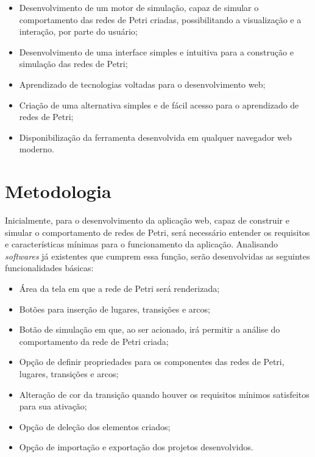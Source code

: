 \documentclass[
	12pt,				%
	openright,			%
	oneside,			%
	a4paper,			%
	english,			%
	brazil				%
	]{abntex2}
\theoremstyle{doispontos}
\begin{document}
\begin{itemize}
        \item Desenvolvimento de um motor de simulação, capaz de simular o comportamento das redes de Petri criadas, possibilitando a visualização e a interação, por parte do usuário;
        \item Desenvolvimento de uma interface simples e intuitiva para a construção e simulação das redes de Petri;
	\item Aprendizado de tecnologias voltadas para o desenvolvimento web; 
	\item Criação de uma alternativa simples e de fácil acesso para o aprendizado de redes de Petri;
        \item Disponibilização da ferramenta desenvolvida em qualquer navegador web moderno.
\end{itemize}


\section{Metodologia}


Inicialmente, para o desenvolvimento da aplicação web, capaz de construir e simular o comportamento de redes de Petri, será necessário entender os requisitos e características mínimas para o funcionamento da aplicação. Analisando \textit{softwares} já existentes que cumprem essa função, serão desenvolvidas as seguintes funcionalidades básicas:

\begin{itemize}
        \item Área da tela em que a rede de Petri será renderizada;
        \item Botões para inserção de lugares, transições e arcos;
        \item Botão de simulação em que, ao ser acionado, irá permitir a análise do comportamento da rede de Petri criada;
        \item Opção de definir propriedades para os componentes das redes de Petri, lugares, transições e arcos;
        \item Alteração de cor da transição quando houver os requisitos mínimos satisfeitos para sua ativação;
        \item Opção de deleção dos elementos criados;
        \item Opção de importação e exportação dos projetos desenvolvidos.
\end{itemize}
\end{document}
